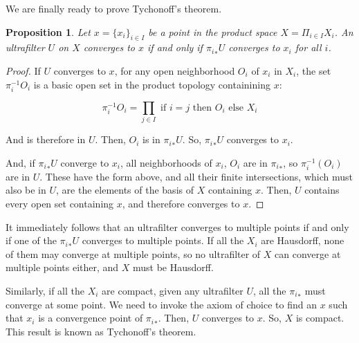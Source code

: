 \documentclass{article}
\newtheorem*{proposition}{Proposition}
\begin{document}
          We are finally ready to prove Tychonoff's theorem.

          \begin{proposition}
            Let $x = \{x_i\}_{i \in I}$ be a point in the product space $X
            =\Pi_{i \in I} X_i$. An ultrafilter $U$ on $X$ converges to $x$ if
            and only if ${\pi_i}_*U$ converges to $x_i$ for all $i$.
          \end{proposition}

          \begin{proof}
          
            If $U$ converges to $x$, for any open neighborhood $O_i$ of $x_i$
            in $X_i$, the set $\pi_i^{-1}O_i$ is a basic open set in the
            product topology containining $x$:

            \[\pi_i^{-1}O_i = \prod_{j \in I} \text { if } i = j \text{ then } O_i
            \text{ else } X_i\]

            And is therefore in $U$. Then, $O_i$ is in ${\pi_i}_*U$. So,
            ${\pi_i}_*U$ converges to $x_i$.

            And, if ${\pi_i}_*U$ converge to $x_i$, all neighborhoods of $x_i$,
            $O_i$ are in ${\pi_i}_*$, so $\pi_i^{-1}(O_i)$ are in $U$. These
            have the form above, and all their finite intersections, which
            must also be in $U$, are the elements of the basis of $X$
            containing $x$. Then, $U$ contains every open set containing $x$,
            and therefore converges to $x$.

          \end{proof}

          It immediately follows that an ultrafilter converges to multiple
          points if and only if one of the ${\pi_i}_*U$ converges to multiple
          points. If all the $X_i$ are Hausdorff, none of them may converge at
          multiple points, so no ultrafilter of $X$ can converge at multiple
          points either, and $X$ must be Hausdorff.

          Similarly, if all the $X_i$ are compact, given any ultrafilter $U$,
          all the ${\pi_i}_*$ must converge at some point. We need to invoke the
          axiom of choice to find an $x$ such that $x_i$ is a convergence point
          of ${\pi_i}_*$. Then, $U$ converges to $x$. So, $X$ is compact. This
          result is known as Tychonoff's theorem.

\end{document}

